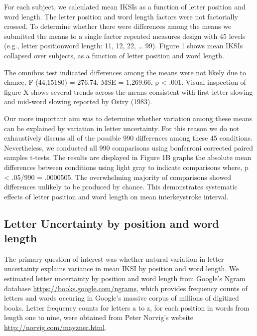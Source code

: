 \documentclass[floatsintext,man]{apa6}
\theoremstyle{definition}
\theoremstyle{definition}
\theoremstyle{definition}
\theoremstyle{remark}
\begin{document}
For each subject, we calculated mean IKSIs as a function of letter
position and word length. The letter position and word length factors
were not factorially crossed. To determine whether there were
differences among the means we submitted the means to a single factor
repeated measures design with 45 levels (e.g., letter
position\textbar{}word length: 1\textbar{}1, 1\textbar{}2, 2\textbar{}2,
\ldots{} 9\textbar{}9). Figure 1 shows mean IKSIs collapsed over
subjects, as a function of letter position and word length.

The omnibus test indicated differences among the means were not likely
due to chance, F (44,15180) = 276.74, MSE = 1,269.66, p \textless{}
.001. Visual inspection of figure X shows several trends across the
means consistent with first-letter slowing and mid-word slowing reported
by Ostry (1983).

Our more important aim was to determine whether variation among these
means can be explained by variation in letter uncertainty. For this
reason we do not exhaustively discuss all of the possible 990
differences among these 45 conditions. Nevertheless, we conducted all
990 comparisons using bonferroni corrected paired samples t-tests. The
results are displayed in Figure 1B graphs the absolute mean differences
between conditions using light gray to indicate comparisons where, p
\textless{} .05/990 = .0000505. The overwhelming majority of comparisons
showed differences unlikely to be produced by chance. This demonstrates
systematic effects of letter position and word length on mean
interkeystroke interval.

\subsection{Letter Uncertainty by position and word
length}\label{letter-uncertainty-by-position-and-word-length}

The primary question of interest was whether natural variation in letter
uncertainty explains variance in mean IKSI by position and word length.
We estimated letter uncertainty by position and word length from
Google's Ngram database \url{https://books.google.com/ngrams}, which
provides frequency counts of letters and words occuring in Google's
massive corpus of millions of digitized books. Letter frequency counts
for letters a to z, for each position in words from length one to nine,
were obtained from Peter Norvig's website
\url{http://norvig.com/mayzner.html}.
\end{document}
